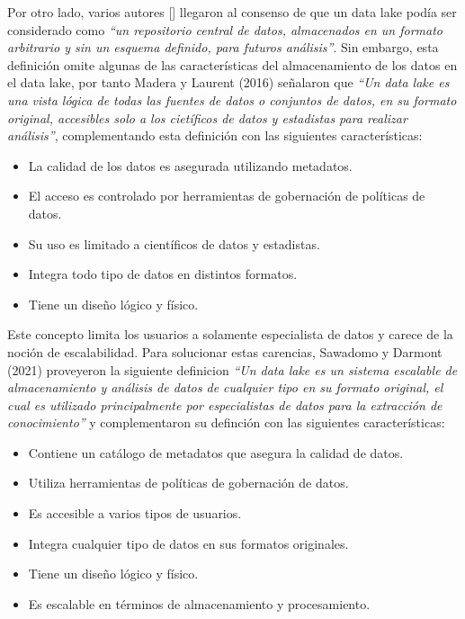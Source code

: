 Por otro lado, varios autores [\cite*{mathis2017data, khine2018data,couto2019mapping}] llegaron al consenso de que un data lake podía
ser considerado como \textit{``un repositorio central de datos, almacenados en un formato arbitrario y sin un esquema definido, para futuros análisis''}. Sin embargo,
esta definición omite algunas de las características del almacenamiento de los datos en el data lake, por tanto Madera y Laurent (2016) \cite{madera2016next} señalaron que
\textit{``Un data lake es una vista lógica de todas las fuentes de datos o conjuntos de datos, en su formato original, accesibles solo a
los cietíficos de datos y estadistas para realizar análisis''}, complementando esta definición con las siguientes características:
\begin{itemize}
    \item La calidad de los datos es asegurada utilizando metadatos.
    \item El acceso es controlado por herramientas de gobernación de políticas de datos.
    \item Su uso es limitado a científicos de datos y estadistas.
    \item Integra todo tipo de datos en distintos formatos.
    \item Tiene un diseño lógico y físico.
\end{itemize}
Este concepto limita los usuarios a solamente especialista de datos y carece de la noción de escalabilidad. Para
solucionar estas carencias, Sawadomo y Darmont (2021) \cite{sawadogo2021data} proveyeron la siguiente
definicion \textit{``Un data lake es un sistema escalable de almacenamiento y análisis de datos de cualquier tipo en su formato original,
el cual es utilizado principalmente por especialistas de datos para la extracción de conocimiento''} y complementaron su definción con las siguientes
características:
\begin{itemize}
    \item Contiene un catálogo de metadatos que asegura la calidad de datos.
    \item Utiliza herramientas de políticas de gobernación de datos.
    \item Es accesible a varios tipos de usuarios.
    \item Integra cualquier tipo de datos en sus formatos originales.
    \item Tiene un diseño lógico y físico.
    \item Es escalable en términos de almacenamiento y procesamiento.
\end{itemize}

